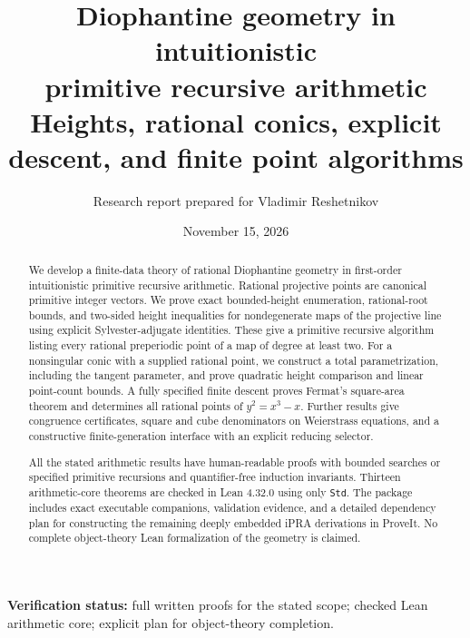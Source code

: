 \documentclass[11pt,letterpaper]{article}
\title{\textbf{Diophantine geometry in intuitionistic\\primitive recursive arithmetic}\\[0.65em]
 \large Heights, rational conics, explicit descent, and finite point algorithms}
\author{Research report prepared for Vladimir Reshetnikov}
\date{November 15, 2026}
\theoremstyle{definition}
\theoremstyle{remark}
\numberwithin{equation}{section}
\begin{document}
\maketitle
\thispagestyle{empty}

\begin{abstract}
We develop a finite-data theory of rational Diophantine geometry in
first-order intuitionistic primitive recursive arithmetic. Rational projective
points are canonical primitive integer vectors. We prove exact bounded-height
enumeration, rational-root bounds, and two-sided height inequalities for
nondegenerate maps of the projective line using explicit Sylvester-adjugate
identities. These give a primitive recursive algorithm listing every rational
preperiodic point of a map of degree at least two. For a nonsingular conic
with a supplied rational point, we construct a total parametrization,
including the tangent parameter, and prove quadratic height comparison and
linear point-count bounds. A fully specified finite descent proves Fermat's
square-area theorem and determines all rational points of
$y^2=x^3-x$. Further results give congruence certificates, square and cube
denominators on Weierstrass equations, and a constructive finite-generation
interface with an explicit reducing selector.

All the stated arithmetic results have human-readable proofs with bounded
searches or specified primitive recursions and quantifier-free induction
invariants. Thirteen arithmetic-core theorems are checked in Lean 4.32.0
using only \texttt{Std}. The package includes exact executable companions,
validation evidence, and a detailed dependency plan for constructing the
remaining deeply embedded iPRA derivations in ProveIt. No complete
object-theory Lean formalization of the geometry is claimed.
\end{abstract}

\vfill
\begin{center}
\small\textbf{Verification status:} full written proofs for the stated scope;
checked Lean arithmetic core; explicit plan for object-theory completion.
\end{center}
\clearpage
\begingroup
\small
\setlength{\parskip}{0pt}
\tableofcontents
\endgroup
\clearpage










\end{document}

